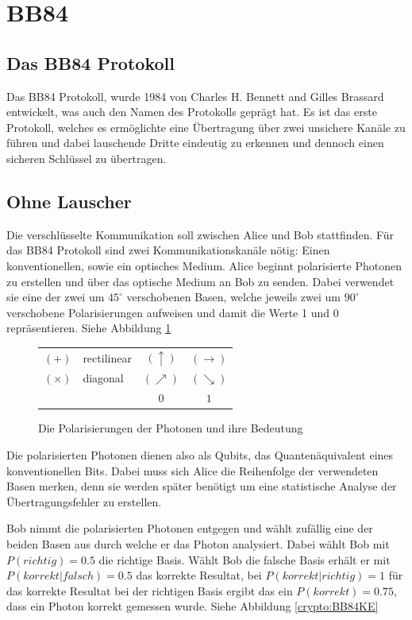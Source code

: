 \section{BB84}
  \subsection{Das BB84 Protokoll}
  Das BB84 Protokoll, wurde 1984 von Charles H. Bennett and Gilles Brassard entwickelt,
  was auch den Namen des Protokolls gepr\"agt hat.
  Es ist das erste Protokoll, welches es erm\"oglichte eine \"Ubertragung \"uber zwei unsichere Kan\"ale zu f\"uhren
  und dabei lauschende Dritte eindeutig zu erkennen und dennoch einen sicheren Schl\"ussel zu \"ubertragen.

  \subsection{Ohne Lauscher}
  Die verschl\"usselte Kommunikation soll zwischen Alice und Bob stattfinden.
  F\"ur das BB84 Protokoll sind zwei Kommunikationskan\"ale n\"otig:
  Einen konventionellen, sowie ein optisches Medium.
  Alice beginnt polarisierte Photonen zu erstellen und \"uber das optische Medium an Bob zu senden.
  Dabei verwendet sie eine der zwei um $45^{\circ}$ verschobenen Basen,
  welche jeweils zwei um $90^{\circ}$ verschobene Polarisierungen aufweisen und damit die Werte 1 und 0 repr\"asentieren. Siehe Abbildung \ref{crypto:poltab}

  \begin{figure}
    \centering
    \begin{tabular}{l l || c c}
      \hline
      $(+)$ & rectilinear & $(\uparrow)$ & $(\rightarrow)$\\
      $(\times)$ & diagonal & $(\nearrow)$ & $(\searrow)$\\
      \hline
      & & $0$ & $1$\\
      \hline
    \end{tabular}
    \caption{Die Polarisierungen der Photonen und ihre Bedeutung\label{crypto:poltab}}
  \end{figure}

  Die polarisierten Photonen dienen also als Qubits, das Quanten\"aquivalent eines konventionellen Bits.
  Dabei muss sich Alice die Reihenfolge der verwendeten Basen merken,
  denn sie werden sp\"ater ben\"otigt um eine statistische Analyse der \"Ubertragungsfehler zu erstellen.

  Bob nimmt die polarisierten Photonen entgegen und w\"ahlt zuf\"allig eine der beiden Basen aus durch welche er das Photon analysiert.
  Dabei w\"ahlt Bob mit
  $P(richtig)=0.5$
  die richtige Basis.
  W\"ahlt Bob die falsche Basis erh\"alt er mit
  $P(korrekt|falsch)=0.5$
  das korrekte Resultat, bei
  $P(korrekt|richtig)=1$
  f\"ur das korrekte Resultat bei der richtigen Basis ergibt das ein
  $P(korrekt)=0.75$,
  dass ein Photon korrekt gemessen wurde.
  Siehe Abbildung \ref{crypto:BB84KE}

